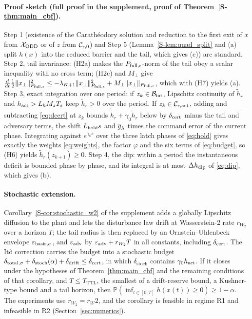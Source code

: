 \paragraph{Proof sketch (full proof in the supplement, proof of Theorem~\ref{S-thm:main_cbf}).}
Step 1 (existence of the Carath\'eodory solution and reduction to the first exit of $x$ from $\mathcal{X}_{\mathrm{ODD}}$ or of $z$ from $\mathcal{C}_{r,0}$) and Step 5 (Lemma~\ref{S-lem:quad_split} and (a) split $h(x)$ into the reduced barrier and the tail, which gives (c)) are standard. Step 2, tail invariance: (H2a) makes the $P_{\mathrm{full},\epsilon}$-norm of the tail obey a scalar inequality with no cross term; (H2c) and $M_\perp$ give $\frac{d}{dt}\tfrac12\|x_\perp\|_{P_{\mathrm{full},\epsilon}}^2 \le -\lambda_{K+1}\|x_\perp\|_{P_{\mathrm{full},\epsilon}}^2 + M_\perp\|x_\perp\|_{P_{\mathrm{full},\epsilon}}$, which with (H7) yields (a). Step 3, exact integration over one period: if $z_k \in \mathcal{B}_{\mathrm{int}}$, Lipschitz continuity of $\tilde h_r$ and $h_{\mathrm{act}} > L_hM_zT_s$ keep $\tilde h_r > 0$ over the period. If $z_k \in \mathcal{C}_{r,\mathrm{act}}$, adding and subtracting \eqref{eq:dcert} at $z_k$ bounds $\dot{\tilde h}_r + \gamma_0\tilde h_r$ below by $\delta_{\mathrm{cert}}$ minus the tail and adversary terms, the shift $L_{\mathrm{hold}} s$ and $\overline{g}_h$ times the command error of the current phase. Integrating against $e^{\gamma_0 s}$ over the three latch phases of \eqref{eq:hold} gives exactly the weights \eqref{eq:weights}, the factor $\varphi$ and the six terms of \eqref{eq:budget}, so (H6) yields $\tilde h_r(z_{k+1}) \ge 0$. Step 4, the dip: within a period the instantaneous deficit is bounded phase by phase, and its integral is at most $\Delta h_{\mathrm{dip}}$ of \eqref{eq:dip}, which gives (b).

\paragraph{Stochastic extension.}
Corollary~\ref{S-cor:stochastic_w2} of the supplement adds a globally Lipschitz diffusion to the plant and lets the disturbance law drift at Wasserstein-2 rate $r_{W_2}$ over a horizon $T$; the tail radius is then replaced by an Ornstein--Uhlenbeck envelope $\varepsilon_{\mathrm{basis},\sigma}$, and $\varepsilon_{\mathrm{adv}}$ by $\varepsilon_{\mathrm{adv}} + r_{W_2}T$ in all constants, including $\delta_{\mathrm{cert}}$. The It\^o correction carries the budget into a stochastic budget $\delta_{\mathrm{total},\sigma} + \delta_{\mathrm{stoch}}(\alpha) + \delta_{\mathrm{drift}} \le \delta_{\mathrm{cert}}$, in which $\delta_{\mathrm{stoch}}$ contains $\gamma_0h_{\mathrm{act}}$. If it closes under the hypotheses of Theorem~\ref{thm:main_cbf} and the remaining conditions of that corollary, and $T \le T_{\mathrm{TTL}}$, the smallest of a drift-reserve bound, a Kushner-type bound \citep{kushner1967stochastic} and a tail horizon, then $\mathbb{P}(\inf_{t\in[0,T]}h(x(t)) \ge 0) \ge 1 - \alpha$. The experiments use $r_{W_2} = {{r_W2}}$, and the corollary is feasible in regime R1 and infeasible in R2 (Section~\ref{sec:numerics}).

